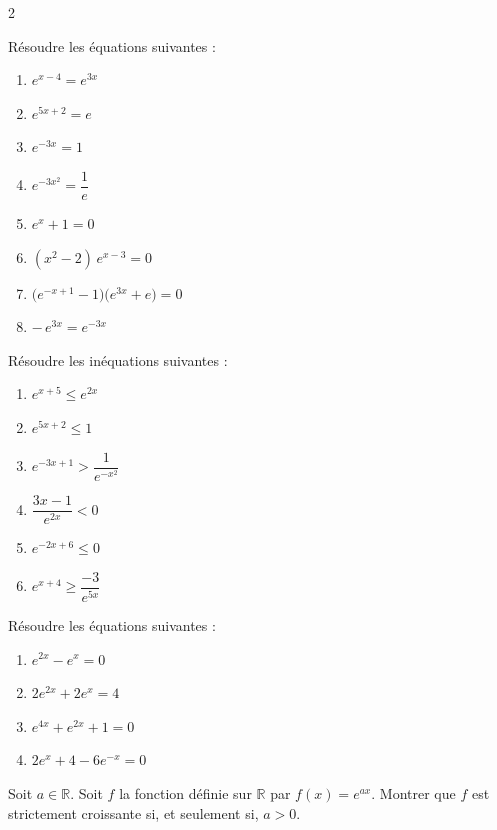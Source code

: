 \documentclass[a4paper,12pt]{article}
\begin{document}
\begin{multicols}{2}
\begin{exercice}[title=Exercice 4 $\star$ { [Calculer] }]{}{}
Résoudre les équations suivantes :
\begin{enumerate}
  \item $e^{x-4} = e^{3x}$
  \item $e^{5x+2} = e$
  \item $e^{-3x} = 1$
  \item $e^{-3x^2} = \dfrac1e$
  \item $e^x + 1 = 0$
  \item $(x^2 - 2)\,e^{x-3} = 0$
  \item $\bigl(e^{-x+1}-1\bigr)\bigl(e^{3x}+e\bigr)=0$
  \item $-\,e^{3x} = e^{-3x}$
\end{enumerate}
\end{exercice}

\begin{exercice}[title=Exercice 5 $\star$ { [Calculer] }]{}{}
  Résoudre les inéquations suivantes :
  \begin{enumerate}
    \item $e^{x+5}\le e^{2x}$
    \item $e^{5x+2}\le 1$
    \item $e^{-3x+1}>\dfrac1{e^{-x^2}}$
    \item $\dfrac{3x-1}{e^{2x}}<0$
    \item $e^{-2x+6}\le 0$
    \item $e^{x+4}\ge \dfrac{-3}{e^{5x}}$
  \end{enumerate}
  \end{exercice}
  
  \begin{exercice}[title=Exercice 6 $\star\star\star$ { [Calculer] }]{}{}
  Résoudre les équations suivantes :
  \begin{enumerate}
    \item $e^{2x}-e^{x}=0$
    \item $2e^{2x}+2e^{x}=4$
    \item $e^{4x}+e^{2x}+1=0$
    \item $2e^{x}+4-6e^{-x}=0$
  \end{enumerate}
  \end{exercice}
  
  \begin{exercice}[title=Exercice 7 $\star\star$ { [Calculer, Raisonner] }]{}{}
  Soit $a\in\mathbb{R}$. Soit $f$ la fonction définie sur $\mathbb{R}$ par $f(x)=e^{ax}$. Montrer que $f$ est strictement croissante si, et seulement si, $a>0$.
  \end{exercice}
  

\end{multicols}
\end{document}
